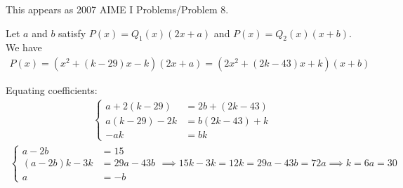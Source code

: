 This appears as 2007 AIME I Problems/Problem 8.

Let $a$ and $b$ satisfy $P(x)=Q_{1}(x)(2x+a)$ and $P(x)=Q_{2}(x)(x+b)$. We have
\begin{align*}
P(x) 
= (x^{2} + (k-29)x - k) (2x + a)
= (2x^{2} + (2k-43)x + k) (x + b)
\end{align*}

Equating coefficients:
\begin{align*}
\left\{\begin{aligned}
a + 2(k-29) 
& = 2b + (2k-43)
\\
a(k-29) - 2k
& = b(2k-43) + k
\\
-ak 
& = bk
\end{aligned}\right.
\end{align*}
\begin{align*}
\left\{\begin{aligned}
a - 2b
& = 15
\\
(a - 2b)k - 3k
& = 29a - 43b
\\
a
& = - b
\end{aligned}\right.
\implies
15k - 3k = 12k = 29a - 43b
= 72a
\implies 
k = 6a = 30
\end{align*}
